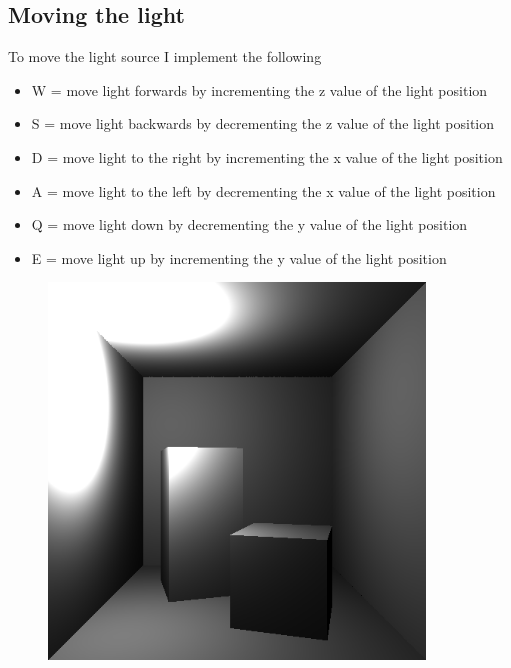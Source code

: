 \subsection{Moving the light}
To move the light source I implement the following
\begin{itemize}
    \item W = move light forwards by incrementing the z value of the light position
    \item S = move light backwards by decrementing the z value of the light position
    \item D = move light to the right by incrementing the x value of the light position
    \item A = move light to the left by decrementing the x value of the light position
    \item Q = move light down by decrementing the y value of the light position
    \item E = move light up by incrementing the y value of the light position
\end{itemize}
\begin{figure}[ht]
    \centering
    \includegraphics[width=10cm]{screenshots/move_light.png}
\end{figure}
\clearpage
